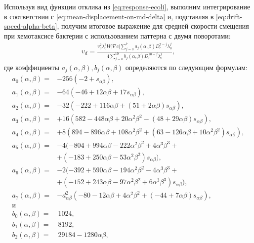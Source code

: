 Используя вид функции отклика из \cref{eq:response-ecoli}, выполним интегрирование в соответствии с \cref{eq:mean-displacement-on-md-delta} и, подставляя в \cref{eq:drift-speed-alpha-beta}, получим итоговое выражение для средней скорости смещения при хемотаксисе бактерии с использованием паттерна с двумя поворотами:
\begin{equation}
    \begin{aligned}
        v_d=\frac{v_0^2\lambda_0^2W|\nabla c|\sum_{j=0}^{7} a_j(\alpha, \beta)D_r^{7-j}\lambda_0^j}{4\sum_{j=0}^{10}b_j(\alpha,\beta)D_r^{10-j}\lambda_0^j},
        \label{eq:drift-speed-solution}
    \end{aligned}
\end{equation}
где коэффициенты $a_j(\alpha,\beta), b_j(\alpha,\beta)$ определяются по следующим формулам:
\begin{equation}
    \begin{aligned}
	a_0(\alpha, \beta) =& - 256\left (-2+s_{\alpha\beta}\right ), \\
	a_1(\alpha, \beta) =& - 64\left (-46+12\alpha\beta+17s_{\alpha\beta}\right ), \\
	a_2(\alpha, \beta) =& - 32\left (-222+116\alpha\beta+(51+2\alpha\beta)s_{\alpha\beta}\right ), \\
	a_3(\alpha, \beta) =& +16\left ( 582-448\alpha\beta+20\alpha^2\beta^2-(48+29\alpha\beta)s_{\alpha\beta} \right ), \\
	a_4(\alpha, \beta) =& +8\left ( 894-896\alpha\beta+108\alpha^2\beta^2+(63-126\alpha\beta+10\alpha^2\beta^2)s_{\alpha\beta} \right ), \\
	a_5(\alpha, \beta) =& - 4( -804+994\alpha\beta-222\alpha^2\beta^2+4\alpha^3\beta^3+\\
    &+(-183+250\alpha\beta-53\alpha^2\beta^2)s_{\alpha\beta} ), \\
	a_6(\alpha, \beta) =& - 2( -392+590\alpha\beta-194\alpha^2\beta^2-4\alpha^3\beta^3+\\
    &+(-152+243\alpha\beta-97\alpha^2\beta^2+6\alpha^3\beta^3)s_{\alpha\beta} ), \\
	a_7(\alpha, \beta) =& - d_{\alpha\beta}^2\left ( -80-12\alpha\beta+4\alpha^2\beta^2+(-44+7\alpha\beta)s_{\alpha\beta} \right ),\\
    \textrm{и}\\
	b_0(\alpha, \beta) =&\, 1024, \\
	b_1(\alpha, \beta) =&\, 8192, \\
	b_2(\alpha, \beta) =&\, 29184 - 1280\alpha\beta, \\

\end{aligned}
\end{equation}

